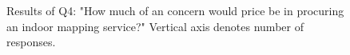 \begin{table}[]
\centering
\caption{Statistics: Question Group 2}
\label{q3q4stats}
\end{table}


\begin{figure}
    \centering
    \caption{Results of Q4: "How much of an concern would price be in procuring an indoor mapping service?" Vertical axis denotes number of responses.}
    \label{fig:q4}
\end{figure}

